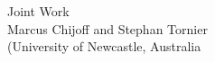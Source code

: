 \documentclass[preview]{standalone}
\begin{document}
\begin{center}
Joint Work \\ Marcus Chijoff and Stephan Tornier \\ (University of Newcastle, Australia
\end{center}
\end{document}
